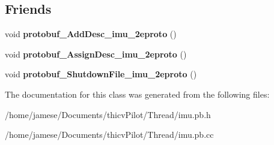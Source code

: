 \subsection*{Friends}
\begin{DoxyCompactItemize}
\item 
\mbox{\label{class_i_m_u_1_1_imu_a2e24c90b95b9d50d708f7edef3aff0fb}} 
void {\bfseries protobuf\+\_\+\+Add\+Desc\+\_\+imu\+\_\+2eproto} ()
\item 
\mbox{\label{class_i_m_u_1_1_imu_a3912750606dd33cba899a5837b91182b}} 
void {\bfseries protobuf\+\_\+\+Assign\+Desc\+\_\+imu\+\_\+2eproto} ()
\item 
\mbox{\label{class_i_m_u_1_1_imu_a74dad64cbf8b435784d45c0a631202fb}} 
void {\bfseries protobuf\+\_\+\+Shutdown\+File\+\_\+imu\+\_\+2eproto} ()
\end{DoxyCompactItemize}


The documentation for this class was generated from the following files\+:\begin{DoxyCompactItemize}
\item 
/home/jamese/\+Documents/thicv\+Pilot/\+Thread/imu.\+pb.\+h\item 
/home/jamese/\+Documents/thicv\+Pilot/\+Thread/imu.\+pb.\+cc\end{DoxyCompactItemize}
